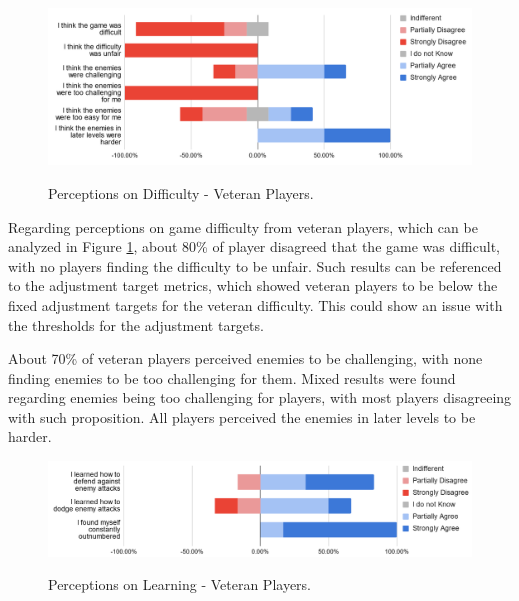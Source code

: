 \begin{figure}[!ht]
    \begin{center}
    \caption{Perceptions on Difficulty - Veteran Players.}
        \includegraphics[width=36em]{figures/fig-perception-difficulty-veteran-players.png}
        \label{fig:perception-difficulty-veteran-players}
    \end{center}
\end{figure}


Regarding perceptions on game difficulty from veteran players, which can be analyzed in Figure \ref{fig:perception-difficulty-veteran-players}, about 80\% of player disagreed that the game was difficult, with no players finding the difficulty to be unfair. Such results can be referenced to the adjustment target metrics, which showed veteran players to be below the fixed adjustment targets for the veteran difficulty. This could show an issue with the thresholds for the adjustment targets.

About 70\% of veteran players perceived enemies to be challenging, with none finding enemies to be too challenging for them. Mixed results were found regarding enemies being too challenging for players, with most players disagreeing with such proposition. All players perceived the enemies in later levels to be harder.

\begin{figure}[!ht]
    \begin{center}
    \caption{Perceptions on Learning - Veteran Players.}
        \includegraphics[width=36em]{figures/fig-perception-learning-veteran-players.png}
        \label{fig:perception-learning-veteran-players}
    \end{center}
\end{figure}

